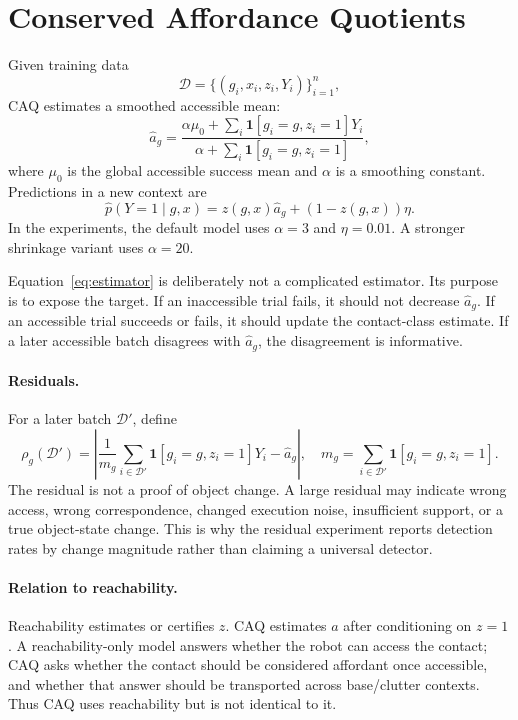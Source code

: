 \documentclass{article}
\newcommand{\ctx}{x}
\newcommand{\gate}{z}
\newcommand{\aff}{a}
\newcommand{\class}{g}
\newcommand{\ind}{\mathbf{1}}
\begin{document}
\section{Conserved Affordance Quotients}

Given training data
\[
    \mathcal{D}=\{(\class_i,\ctx_i,\gate_i,Y_i)\}_{i=1}^{n},
\]
CAQ estimates a smoothed accessible mean:
\begin{equation}
    \hat{\aff}_{g} =
    \frac{\alpha \mu_0 + \sum_i \ind[\class_i=g,\gate_i=1]Y_i}
    {\alpha + \sum_i \ind[\class_i=g,\gate_i=1]},
    \label{eq:estimator}
\end{equation}
where $\mu_0$ is the global accessible success mean and $\alpha$ is a smoothing constant. Predictions in a new context are
\begin{equation}
    \hat{p}(Y=1\mid g,\ctx)=
    \gate(g,\ctx)\hat{\aff}_{g}+(1-\gate(g,\ctx))\eta.
    \label{eq:prediction}
\end{equation}
In the experiments, the default model uses $\alpha=3$ and $\eta=0.01$. A stronger shrinkage variant uses $\alpha=20$.

Equation~\ref{eq:estimator} is deliberately not a complicated estimator. Its purpose is to expose the target. If an inaccessible trial fails, it should not decrease $\hat{\aff}_g$. If an accessible trial succeeds or fails, it should update the contact-class estimate. If a later accessible batch disagrees with $\hat{\aff}_g$, the disagreement is informative.

\paragraph{Residuals.}
For a later batch $\mathcal{D}'$, define
\begin{equation}
    \rho_g(\mathcal{D}') =
    \left|
    \frac{1}{m_g}\sum_{i\in \mathcal{D}'} \ind[\class_i=g,\gate_i=1]Y_i
    -
    \hat{\aff}_g
    \right|,
    \quad
    m_g=\sum_{i\in \mathcal{D}'} \ind[\class_i=g,\gate_i=1].
    \label{eq:residual}
\end{equation}
The residual is not a proof of object change. A large residual may indicate wrong access, wrong correspondence, changed execution noise, insufficient support, or a true object-state change. This is why the residual experiment reports detection rates by change magnitude rather than claiming a universal detector.

\paragraph{Relation to reachability.}
Reachability estimates or certifies $\gate$. CAQ estimates $\aff$ after conditioning on $\gate=1$. A reachability-only model answers whether the robot can access the contact; CAQ asks whether the contact should be considered affordant once accessible, and whether that answer should be transported across base/clutter contexts. Thus CAQ uses reachability but is not identical to it.
\end{document}
